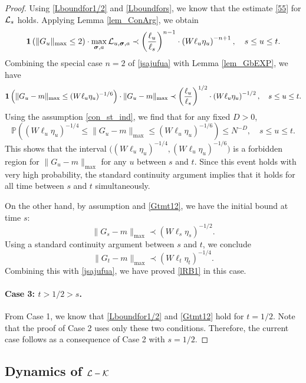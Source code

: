\documentclass[10pt,reqno]{article}
\theoremstyle{plain} %
\theoremstyle{remark}
\numberwithin{equation}{section}
\begin{document}
\begin{proof}
Using \eqref{Lboundfor1/2} and \eqref{Lboundfors}, we know that the estimate \eqref{55} for \({\cal L}_s\) holds. Applying Lemma \ref{lem_ConArg}, we obtain
\begin{equation}\label{jsajufua}
    {\bf 1}\left(\|G_{u}\|_{\max} \leq 2\right) \cdot \max_{\boldsymbol{\sigma}, \textbf{a}} {\cal L}_{u, \boldsymbol{\sigma}, \textbf{a}} \prec \left( \frac{\ell_u}{\ell_s} \right)^{n-1} \cdot \left( W \ell_u \eta_u \right)^{-n+1}, \quad s \leq u \leq t.
\end{equation}
Combining the special case \(n = 2\) of \eqref{jsajufua} with Lemma \ref{lem_GbEXP}, we have
$$
{\bf 1}\left(\|G_u - m\|_{\max} \leq (W \ell_u \eta_u)^{-1/6}\right) \cdot \|G_u - m\|_{\max} \prec \left( \frac{\ell_u}{\ell_s} \right)^{1/2} \cdot \left( W \ell_u \eta_u \right)^{-1/2}, \quad s \leq u \leq t.
$$
Using the assumption \eqref{con_st_ind}, we find that for any fixed \(D > 0\),
\begin{equation}
    \mathbb{P}\left((W \ell_u \eta_u)^{-1/4} \leq \|G_u - m\|_{\max} \leq (W \ell_u \eta_u)^{-1/6}\right) \leq N^{-D}, \quad s \leq u \leq t.
\end{equation}
This shows that the interval \(\big((W \ell_u \eta_u)^{-1/4}, (W \ell_u \eta_u)^{-1/6}\big)\) is a forbidden region for \(\|G_u - m\|_{\max}\) for any \(u\) between \(s\) and \(t\). Since this event holds with very high probability, the standard continuity argument implies that it holds for all time between \(s\) and \(t\) simultaneously.

On the other hand, by assumption and \eqref{Gtmt12}, we have the initial bound at time \(s\):
$$
\|G_s - m\|_{\max} \prec (W \ell_s \eta_s)^{-1/2}.
$$
Using a standard continuity argument between \(s\) and \(t\), we conclude
$$
\|G_t - m\|_{\max} \prec (W \ell_t \eta_t)^{-1/4}.
$$
Combining this with \eqref{jsajufua}, we have proved \eqref{lRB1} in this case.

\paragraph{Case 3: \(t > 1/2 > s\).} From Case 1, we know that \eqref{Lboundfor1/2} and \eqref{Gtmt12} hold for \(t = 1/2\). Note that the proof of Case 2 uses only these two conditions. Therefore, the current case follows as a consequence of Case 2 with \(s = 1/2\).

\end{proof}



\subsection{Dynamics of  \texorpdfstring{$\cal L-\cal K$}{L-K}}
\end{document}
